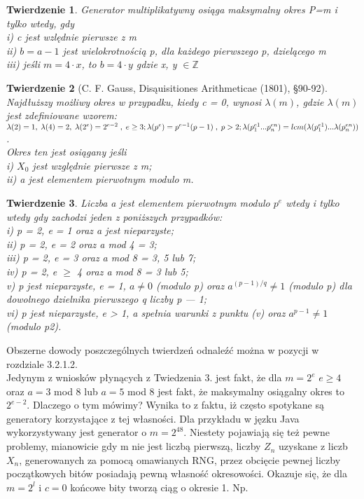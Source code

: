 \documentclass[a4paper]{scrartcl}
\newtheorem{theorem}{Twierdzenie}
\begin{document}
\begin{theorem}
Generator multiplikatywny osiąga maksymalny okres P=m i tylko wtedy, gdy\\
i) c jest wzlędnie pierwsze z m\\
ii) $b = a - 1$ jest wielokrotnością p, dla każdego pierwszego p, dzielącego m\\
iii) jeśli $m = 4 \cdot x$, to $b=4 \cdot y$ gdzie x, y $\in \mathbb{Z}$
\end{theorem}
\begin{theorem}[C. F. Gauss, Disąuisitiones Arithmeticae (1801), §90-92]
Najdłuższy możliwy okres w przypadku, kiedy c = 0, wynosi $\lambda(m)$, gdzie $\lambda(m)$
jest zdefiniowane wzorem:\\
$\lambda(2)=1, \; \lambda(4)=2, \; \lambda(2^e)=2^{e-2} \;,\; e \geq 3;\\
\lambda(p^e)=p^{e-1}(p-1) \;,\; p > 2;\\
\lambda(p_1^{e1}...p_n^{en}) = lcm(\lambda(p_1^{e1})...\lambda(p_n^{en}))$.\\ Okres ten jest osiągany jeśli\\
i) $X_0$ jest względnie pierwsze z m;\\
ii) a jest elementem pierwotnym modulo m.
\end{theorem}
\clearpage
\begin{theorem}
Liczba a jest elementem pierwotnym modulo $p^e$ wtedy i tylko
wtedy gdy zachodzi jeden z poniższych przypadków:\\
i) p = 2, e = 1 oraz a jest nieparzyste;\\
ii) p = 2, e = 2 oraz a mod 4 = 3;\\
iii) p = 2, e = 3 oraz a mod 8 = 3, 5 lub 7;\\
iv) p = 2, e $\geq$ 4 oraz a mod 8 = 3 lub 5;\\
v) p jest nieparzyste, e = 1, $a\neq0$ (modulo p) oraz $a^{(p-1)/q}\neq1$ (modulo p)
dla dowolnego dzielnika pierwszego q liczby p — 1;\\
vi) p jest nieparzyste, e > 1, a spełnia warunki z punktu (v) oraz $a^{p-1} \neq1$
(modulo p2). 
\end{theorem}
Obszerne dowody poszczególnych twierdzeń odnaleźć można w pozycji \cite{Knuth} w rozdziale 3.2.1.2.\\
Jedynym z wniosków płynących z Twiedzenia 3. jest fakt, że dla $m=2^e$ $e\geq4$ oraz $a=3$ mod 8 lub $a=5$ mod 8 jest fakt, że maksymalny osiągalny okres to $2^{e-2}$. Dlaczego o tym mówimy? Wynika to z faktu, iż często spotykane są generatory korzystające z tej własności. Dla przykładu w jęzku Java wykorzystywany jest generator o $m=2^{48}$. Niestety pojawiają się też pewne problemy, mianowicie gdy m nie jest liczbą pierwszą, liczby $Z_n$ uzyskane z liczb $X_n$, generowanych za pomocą omawianych RNG, przez obcięcie pewnej liczby początkowych bitów posiadają pewną własność okresowości. Okazuje się, że dla $m=2^l$ i $c=0$ końcowe bity tworzą ciąg o okresie 1. Np.\\
\end{document}

